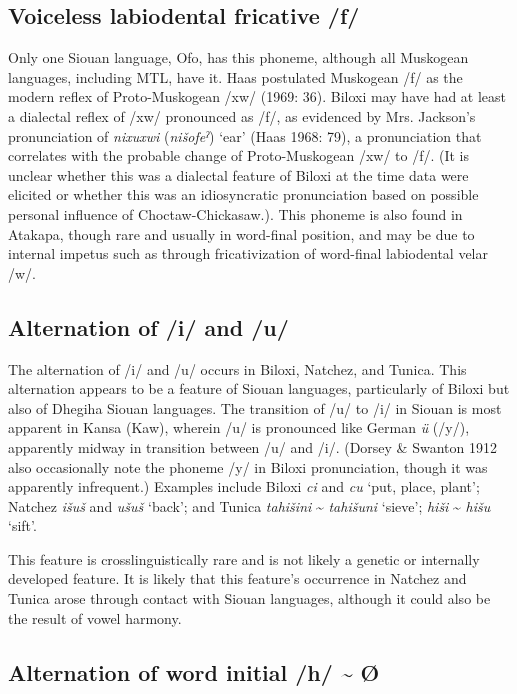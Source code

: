 \documentclass[output=paper]{LSP/langsci}
\begin{document}
\subsection{Voiceless labiodental fricative /f/}

Only one Siouan language, Ofo, has this phoneme, although all Muskogean languages, including MTL, have it. Haas postulated Muskogean /f/ as the modern reflex of Proto-Muskogean /xw/ (1969: 36). Biloxi may have had at least a dialectal reflex of /xw/ pronounced as /f/, as evidenced by Mrs. Jackson’s pronunciation of \emph{nixuxwi} (\emph{nišofeˀ}) `ear' (Haas 1968: 79), a pronunciation that correlates with the probable change of Proto-Muskogean /xw/ to /f/. (It is unclear whether this was a dialectal feature of Biloxi at the time data were elicited or whether this was an idiosyncratic pronunciation based on possible personal influence of Choctaw-Chickasaw.). This phoneme is also found in Atakapa, though rare and usually in word-final position, and may be due to internal impetus such as through fricativization of word-final labiodental velar /w/.

\subsection{Alternation of /i/ and /u/}
	
The alternation of /i/ and /u/ occurs in Biloxi, Natchez, and Tunica. This alternation appears to be a feature of Siouan languages, particularly of Biloxi but also of Dhegiha Siouan languages. The transition of /u/ to /i/ in Siouan is most apparent in Kansa (Kaw), wherein /u/ is pronounced like German \emph{ü} (/y/), apparently midway in transition between /u/ and /i/. (Dorsey \& Swanton 1912 also occasionally note the phoneme /y/ in Biloxi pronunciation, though it was apparently infrequent.) Examples include Biloxi \emph{ci} and \emph{cu} `put, place, plant'; Natchez \emph{išuš} and \emph{ušuš} `back'; and Tunica \emph{tahišini} \textasciitilde{} \emph{tahišuni} `sieve';  \emph{hiši} \textasciitilde{} \emph{hišu} `sift'.

This feature is crosslinguistically rare and is not likely a genetic or internally developed feature. It is likely that this feature’s occurrence in Natchez and Tunica arose through contact with Siouan languages, although it could also be the result of vowel harmony. 

\subsection{Alternation of word initial /h/ \textasciitilde{} Ø}
\end{document}
